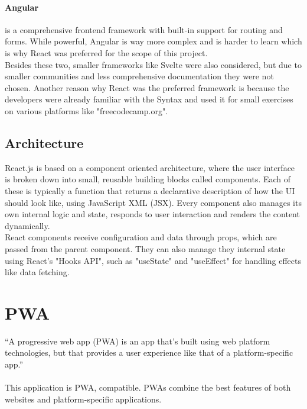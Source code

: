 \documentclass[a4paper,12pt]{report}
\begin{document}
\paragraph{Angular} is a comprehensive frontend framework with built-in support for routing and forms. While powerful, Angular is way more complex and is harder to learn which is why React was preferred for the scope of this project. \cite{angular-docs} \\
Besides these two, smaller frameworks like Svelte were also considered, but due to smaller communities and less comprehensive documentation they were not chosen. Another reason why React was the preferred framework is because the developers were already familiar with the Syntax and used it for small exercises on various platforms like "freecodecamp.org".
\subsection{Architecture}
React.js is based on a component oriented architecture, where the user interface is broken down into small, reusable building blocks called components. Each of these is typically a function that returns a declarative description of how the UI should look like, using JavaScript XML (JSX). Every component also manages its own internal logic and state, responds to user interaction and renders the content dynamically. \\
React components receive configuration and data through props, which are passed from the parent component. They can also manage they internal state using React's "Hooks API", such as "useState" and "useEffect" for handling effects like data fetching. \cite{react-docs} \cite{mdn-react}

\section{PWA}
“A progressive web app (PWA) is an app that's built using web platform technologies, but that provides a user experience like that of a platform-specific app.” \parencite{mdn-pwa} \\\\
This application is PWA, compatible. PWAs combine the best features of both websites and platform-specific applications. \parencite{mdn-pwa} \\\\
\end{document}
